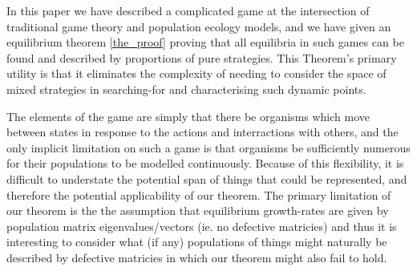 In this paper we have described a complicated game at the intersection of traditional game theory and population ecology models, and we have given an equilibrium theorem \ref{the_proof} proving that all equilibria in such games can be found and described by proportions of pure strategies. This Theorem's primary utility is that it eliminates the complexity of needing to consider the space of mixed strategies in searching-for and characterising such dynamic points.

The elements of the game are simply that there be organisms which move between states in response to the actions and interractions with others,
and the only implicit limitation on such a game is that organisms be sufficiently numerous for their populations to be modelled continuously.
Because of this flexibility, it is difficult to understate the potential span of things that could be represented, and therefore the potential applicability of our theorem.
The primary limitation of our theorem is the the assumption that equilibrium growth-rates are given by population matrix eigenvalues/vectors (ie. no defective matricies) and thus it is interesting to consider what (if any) populations of things might naturally be described by defective matricies in which our theorem might also fail to hold.



